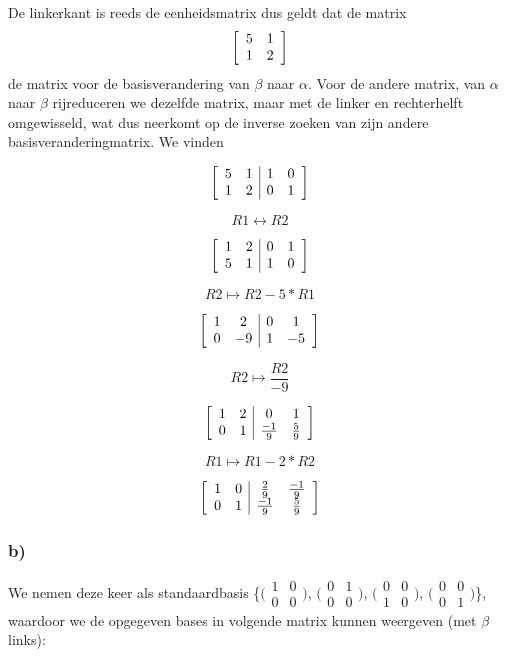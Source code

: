 \documentclass[lineaire_algebra_oplossingen.tex]{subfiles}
\begin{document}
De linkerkant is reeds de eenheidsmatrix dus geldt dat de matrix 
\[
\left[
\begin{array}{ c c }
5 & 1\\
1 & 2
\end{array}
\right]
\]
de matrix voor de basisverandering van $\beta$ naar $\alpha$. Voor de andere matrix, van $\alpha$ naar $\beta$ rijreduceren we dezelfde matrix, maar met de linker en rechterhelft omgewisseld, wat dus neerkomt op de inverse zoeken van zijn andere basisveranderingmatrix. We vinden

\[
\left[
\begin{array}{ c c | c c }
5 & 1 & 1 & 0\\
1 & 2 & 0 & 1
\end{array}
\right]
\]

\[R1 \leftrightarrow R2 \]

\[
\left[
\begin{array}{ c c | c c }
1 & 2 & 0 & 1\\
5 & 1 & 1 & 0
\end{array}
\right]
\]

\[R2 \mapsto R2 - 5*R1 \]

\[
\left[
\begin{array}{ c c | c c }
1 & 2 & 0 & 1\\
0 & -9 & 1 & -5
\end{array}
\right]
\]

\[R2 \mapsto \frac{R2}{-9} \]

\[
\left[
\begin{array}{ c c | c c }
1 & 2 & 0 & 1\\
0 & 1 & \frac{-1}{9} & \frac{5}{9}
\end{array}
\right]
\]

\[R1 \mapsto R1 - 2*R2 \]

\[
\left[
\begin{array}{ c c | c c }
1 & 0 & \frac{2}{9} & \frac{-1}{9}\\
0 & 1 & \frac{-1}{9} & \frac{5}{9}
\end{array}
\right]
\]

\subsubsection*{b)}

We nemen deze keer als standaardbasis \{$\bigl(
\begin{smallmatrix}
1&0\\ 0&0
\end{smallmatrix}
\bigr)$,
$\bigl(
\begin{smallmatrix}
0&1\\ 0&0
\end{smallmatrix}
\bigr)$,
$\bigl(
\begin{smallmatrix}
0&0\\ 1&0
\end{smallmatrix}
\bigr)$,
$\bigl(
\begin{smallmatrix}
0&0\\ 0&1
\end{smallmatrix}
\bigr)$\}, waardoor we de opgegeven bases in volgende matrix kunnen weergeven (met $\beta$ links):
\end{document}
